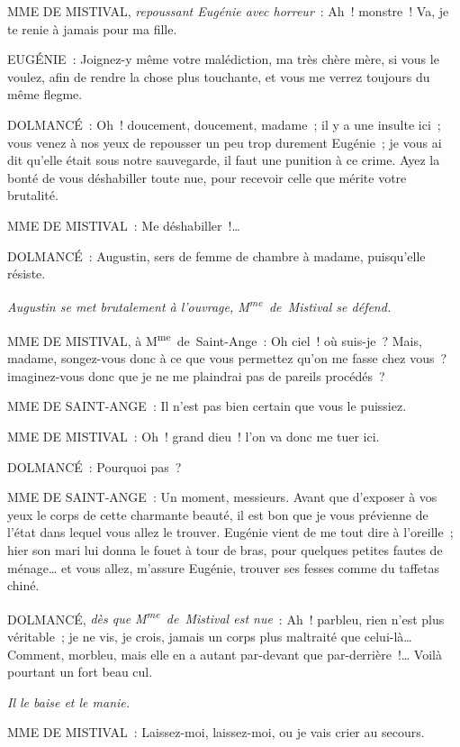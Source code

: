 \documentclass[french,twoside]{book} %
\begin{document}
MME DE MISTIVAL, {\itshape repoussant Eugénie avec horreur} : Ah ! monstre ! Va, je te renie à jamais pour ma fille.\par
EUGÉNIE : Joignez-y même votre malédiction, ma très chère mère, si vous le voulez, afin de rendre la chose plus touchante, et vous me verrez toujours du même flegme.\par
DOLMANCÉ : Oh ! doucement, doucement, madame ; il y a une insulte ici ; vous venez à nos yeux de repousser un peu trop durement Eugénie ; je vous ai dit qu’elle était sous notre sauvegarde, il faut une punition à ce crime. Ayez la bonté de vous déshabiller toute nue, pour recevoir celle que mérite votre brutalité.\par
MME DE MISTIVAL : Me déshabiller !…\par
DOLMANCÉ : Augustin, sers de femme de chambre à madame, puisqu’elle résiste.\par
{\itshape Augustin se met brutalement à l’ouvrage, M\textsuperscript{me} de Mistival se défend. }\par
MME DE MISTIVAL, à M\textsuperscript{me} de Saint-Ange : Oh ciel ! où suis-je ? Mais, madame, songez-vous donc à ce que vous permettez qu’on me fasse chez vous ? imaginez-vous donc que je ne me plaindrai pas de pareils procédés ?\par
MME DE SAINT-ANGE : Il n’est pas bien certain que vous le puissiez.\par
MME DE MISTIVAL : Oh ! grand dieu ! l’on va donc me tuer ici.\par
DOLMANCÉ : Pourquoi pas ?\par
MME DE SAINT-ANGE : Un moment, messieurs. Avant que d’exposer à vos yeux le corps de cette charmante beauté, il est bon que je vous prévienne de l’état dans lequel vous allez le trouver. Eugénie vient de me tout dire à l’oreille ; hier son mari lui donna le fouet à tour de bras, pour quelques petites fautes de ménage… et vous allez, m’assure Eugénie, trouver ses fesses comme du taffetas chiné.\par
DOLMANCÉ, {\itshape dès que M\textsuperscript{me} de Mistival est nue} : Ah ! parbleu, rien n’est plus véritable ; je ne vis, je crois, jamais un corps plus maltraité que celui-là… Comment, morbleu, mais elle en a autant par-devant que par-derrière !… Voilà pourtant un fort beau cul.\par
{\itshape Il le baise et le manie.}\par
MME DE MISTIVAL : Laissez-moi, laissez-moi, ou je vais crier au secours.\par
\end{document}
